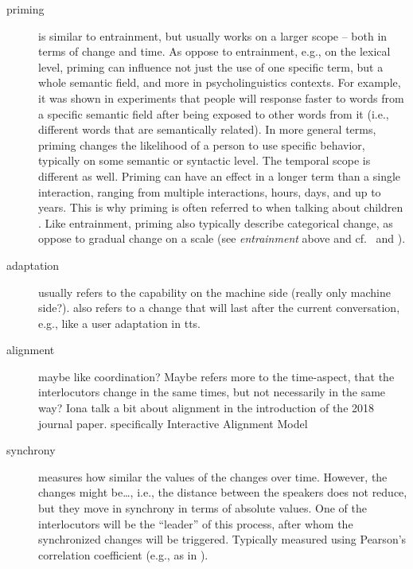 \begin{description}
	\item[priming] is similar to entrainment, but usually works on a larger scope -- both in terms of change and time.
	As oppose to entrainment, e.g., on the lexical level, priming can influence not just the use of one specific term, but a whole semantic field, and more in psycholinguistics contexts.
	For example, it was shown in experiments \cite[e.g.,][]{Meyer1971facilitation, Schvaneveldt1973retrieval} that people will response faster to words from a specific semantic field after being exposed to other words from it (i.e., different words that are semantically related).
	In more general terms, priming changes the likelihood of a person to use specific behavior, typically on some semantic or syntactic level.
	The temporal scope is different as well.
	Priming can have an effect in a longer term than a single interaction, ranging from multiple interactions, hours, days, and up to years.
	This is why priming is often referred to when talking about children \cite[see e.g.\ ][]{Huttenlocher2004syntactic, Wansink2012would}.
	Like entrainment, priming also typically describe categorical change, as oppose to gradual change on a scale (see \textit{entrainment} above and cf.\ \citet{Reitter2006computational} and \citet{Pace2013concept}).
	
	\item[adaptation] usually refers to the capability on the machine side (really only machine side?).
	also refers to a change that will last after the current conversation, e.g., like a user adaptation in \ac{tts}.
	
	\item[alignment] maybe like coordination? Maybe refers more to the time-aspect, that the interlocutors change in the same times, but not necessarily in the same way? Iona talk a bit about alignment in the introduction of the 2018 journal paper. specifically Interactive Alignment Model \citep{Pickering2004behavioral}
	
	\item[synchrony] measures how similar the values of the changes over time.
	However, the changes might be\ldots, i.e., the distance between the speakers does not reduce, but they move in synchrony in terms of absolute values.
	One of the interlocutors will be the ``leader'' of this process, after whom the synchronized changes will be triggered.
	Typically measured using Pearson's correlation coefficient (e.g., as in \citet{Edlund2009pause, Xia2014prosodic}).
	

\end{description}
